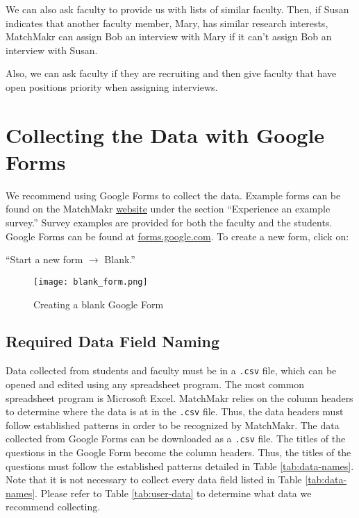 We can also ask faculty to provide us with lists of similar faculty.  Then, if Susan indicates that another faculty member, Mary, has similar research interests, MatchMakr can assign Bob an interview with Mary if it can't assign Bob an interview with Susan.

Also, we can ask faculty if they are recruiting and then give faculty that have open positions priority when assigning interviews.



\section{Collecting the Data with Google Forms}

We recommend using Google Forms to collect the data.  Example forms can be found on the MatchMakr \href{https://sites.google.com/case.edu/matchmakr/home}{website} under the section ``Experience an example survey.''  Survey examples are provided for both the faculty and the students. Google Forms can be found at \url{forms.google.com}.  To create a new form, click on: \par ``Start a new form $\rightarrow$ Blank.''

\begin{figure}[!h]
	\texttt{[image: blank\_form.png]}
	\caption{\label{fig:blank-form} Creating a blank Google Form}
\end{figure}



%
%
\subsection{Required Data Field Naming}
Data collected from students and faculty must be in a \texttt{.csv} file, which can be opened and edited using any spreadsheet program.  The most common spreadsheet program is Microsoft Excel.  MatchMakr relies on the column headers to determine where the data is at in the \texttt{.csv} file.  Thus, the data headers must follow established patterns in order to be recognized by MatchMakr.  The data collected from Google Forms can be downloaded as a \texttt{.csv} file.  The titles of the questions in the Google Form become the column headers.  Thus, the titles of the questions must follow the established patterns detailed in Table \ref{tab:data-names}.  Note that it is not necessary to collect every data field listed in Table \ref{tab:data-names}.  Please refer to Table \ref{tab:user-data} to determine what data we recommend collecting.


